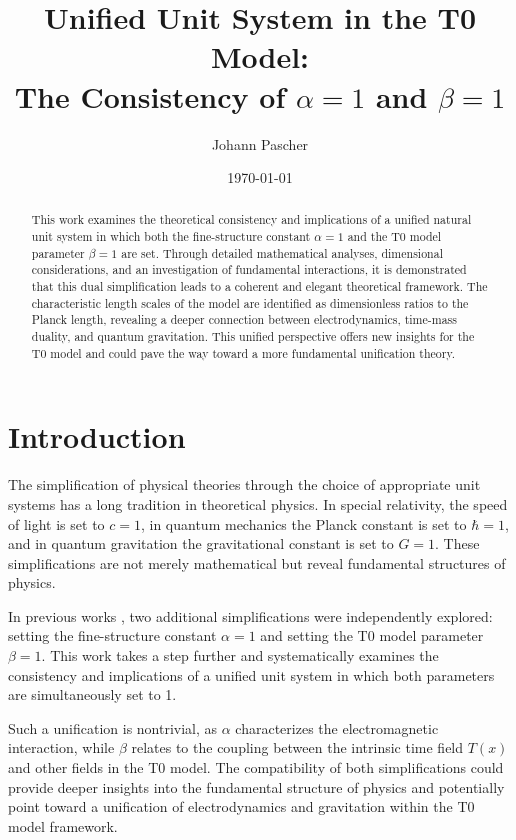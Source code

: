 \documentclass[12pt,a4paper]{article}
\title{Unified Unit System in the T0 Model: \\The Consistency of \(\alpha = 1\) and \(\beta = 1\)}
\author{Johann Pascher}
\date{\today}
\newcommand{\Tfield}{T(x)}
\begin{document}
	
	\maketitle
	
	\begin{abstract}
		This work examines the theoretical consistency and implications of a unified natural unit system in which both the fine-structure constant \(\alpha = 1\) and the T0 model parameter \(\beta = 1\) are set. Through detailed mathematical analyses, dimensional considerations, and an investigation of fundamental interactions, it is demonstrated that this dual simplification leads to a coherent and elegant theoretical framework. The characteristic length scales of the model are identified as dimensionless ratios to the Planck length, revealing a deeper connection between electrodynamics, time-mass duality, and quantum gravitation. This unified perspective offers new insights for the T0 model and could pave the way toward a more fundamental unification theory.
	\end{abstract}
	
	\tableofcontents
	\newpage
	
	\section{Introduction}
	
	The simplification of physical theories through the choice of appropriate unit systems has a long tradition in theoretical physics. In special relativity, the speed of light is set to \(c = 1\), in quantum mechanics the Planck constant is set to \(\hbar = 1\), and in quantum gravitation the gravitational constant is set to \(G = 1\). These simplifications are not merely mathematical but reveal fundamental structures of physics.
	
	In previous works \cite{pascher_alpha_2025, pascher_beta_2025}, two additional simplifications were independently explored: setting the fine-structure constant \(\alpha = 1\) and setting the T0 model parameter \(\beta = 1\). This work takes a step further and systematically examines the consistency and implications of a unified unit system in which both parameters are simultaneously set to 1.
	
	Such a unification is nontrivial, as \(\alpha\) characterizes the electromagnetic interaction, while \(\beta\) relates to the coupling between the intrinsic time field \(\Tfield\) and other fields in the T0 model. The compatibility of both simplifications could provide deeper insights into the fundamental structure of physics and potentially point toward a unification of electrodynamics and gravitation within the T0 model framework.
	
\end{document}
